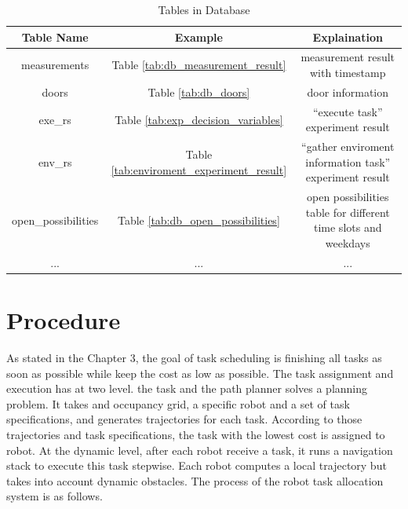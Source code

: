 \begin{table}[htb]
\centering
\begin{tabular}{|c|c|c|} 
\hline
Table Name & Example & Explaination \\ \hline
measurements & Table \ref{tab:db_measurement_result}  & measurement result with timestamp \\ \hline
doors   & Table \ref{tab:db_doors} & door information \\ \hline
exe\_rs  & Table \ref{tab:exp_decision_variables} & ``execute task'' experiment result \\ \hline
env\_rs & Table \ref{tab:enviroment_experiment_result} & ``gather enviroment information task'' experiment result \\ \hline
open\_possibilities & Table \ref{tab:db_open_possibilities} & open possibilities table for different time slots and weekdays \\ \hline
... & ... & ... \\ \hline
\end{tabular}
\caption{Tables in Database}
\label{tab:tables_in_database}
\end{table}

\section{Procedure}
As stated in the Chapter 3, the goal of task scheduling is finishing all tasks as soon as possible while keep the cost as low as possible. 
The task assignment and execution has at two level. \cite{Ivan2017} the task and the path planner solves a planning problem. It takes and occupancy grid, a specific robot and a set of task specifications, and generates trajectories for each task. According to those trajectories and task specifications, the task with the lowest cost is assigned to robot.
At the dynamic level, after each robot receive a task, it runs a navigation stack to execute this task stepwise. Each robot computes a local trajectory but takes into account dynamic obstacles.
The process of the robot task allocation system is as follows.

